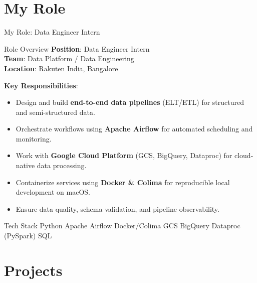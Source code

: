\documentclass{beamer}
\begin{document}
\section{My Role}
\begin{frame}[shrink=8]{My Role: Data Engineer Intern}
  \begin{block}{\faUserTie\quad Role Overview}
    \textbf{Position}: Data Engineer Intern \\
    \textbf{Team}: Data Platform / Data Engineering \\
    \textbf{Location}: Rakuten India, Bangalore
  \end{block}
  \vspace{0.15cm}
  
  \textbf{Key Responsibilities}:
  \begin{itemize}
    \item[\textcolor{RakutenCrimson}{\faDatabase}] Design and build \textbf{end-to-end data pipelines} (ELT/ETL) for structured and semi-structured data.
    \item[\textcolor{DeepBlue}{\faCogs}] Orchestrate workflows using \textbf{Apache Airflow} for automated scheduling and monitoring.
    \item[\textcolor{TealGreen}{\faCloud}] Work with \textbf{Google Cloud Platform} (GCS, BigQuery, Dataproc) for cloud-native data processing.
    \item[\textcolor{VividOrange}{\faDocker}] Containerize services using \textbf{Docker \& Colima} for reproducible local development on macOS.
    \item[\textcolor{SoftPurple}{\faChartBar}] Ensure data quality, schema validation, and pipeline observability.
  \end{itemize}
  
  \begin{alertblock}{\faStar\quad Tech Stack}
    Python \textbullet{} Apache Airflow \textbullet{} Docker/Colima \textbullet{} GCS \textbullet{} BigQuery \textbullet{} Dataproc (PySpark) \textbullet{} SQL
  \end{alertblock}
\end{frame}

\section{Projects}
\end{document}
